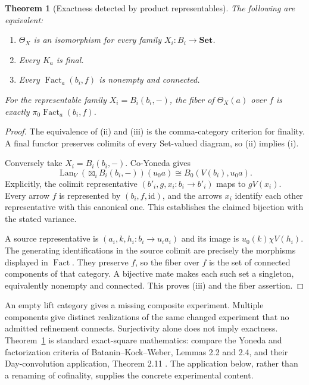 \documentclass[11pt]{article}
\newtheorem{theorem}{Theorem}
\theoremstyle{definition}\newtheorem{definition}[theorem]{Definition}
\theoremstyle{remark}\newtheorem{remark}[theorem]{Remark}
\newcommand{\Set}{\mathbf{Set}}
\newcommand{\Lan}{\operatorname{Lan}}
\newcommand{\Fact}{\operatorname{Fact}}
\newcommand{\id}{\mathrm{id}}
\begin{document}
\begin{theorem}[Exactness detected by product representables]\label{thm:set}
The following are equivalent:
\begin{enumerate}[label=(\roman*)]
\item $\Theta_X$ is an isomorphism for every family $X_i:B_i\to\Set$.
\item Every $K_a$ is final.
\item Every $\Fact_a(b_i,f)$ is nonempty and connected.
\end{enumerate}
For the representable family $X_i=B_i(b_i,-)$, the fiber of
$\Theta_X(a)$ over $f$ is exactly $\pi_0\Fact_a(b_i,f)$.
\end{theorem}
\begin{proof}
The equivalence of (ii) and (iii) is the comma-category criterion for
finality. A final functor preserves colimits of every Set-valued diagram,
so (ii) implies (i).

Conversely take $X_i=B_i(b_i,-)$. Co-Yoneda gives
\[
 \Lan_V(\mathop{\boxtimes}_i B_i(b_i,-))(u_0a)
       \cong B_0(V(b_i),u_0a).
\]
Explicitly, the colimit representative
$(b'_i,g,x_i:b_i\to b'_i)$ maps to $gV(x_i)$. Every arrow $f$ is
represented by $(b_i,f,\id)$, and the arrows $x_i$ identify each other
representative with this canonical one. This establishes the claimed
bijection with the stated variance.

A source representative is $(a_i,k,h_i:b_i\to u_i a_i)$ and its image
is $u_0(k)\chi V(h_i)$. The generating identifications in the source
colimit are precisely the morphisms displayed in $\Fact$. They preserve
$f$, so the fiber over $f$ is the set of connected components of that
category. A bijective mate makes each such set a singleton, equivalently
nonempty and connected. This proves (iii) and the fiber assertion.
\end{proof}

An empty lift category gives a missing composite experiment. Multiple
components give distinct realizations of the same changed experiment
that no admitted refinement connects. Surjectivity alone does not imply
exactness. Theorem~\ref{thm:set} is standard exact-square mathematics:
compare the Yoneda and factorization criteria of
Batanin--Kock--Weber, Lemmas 2.2 and 2.4, and their Day-convolution
application, Theorem 2.11 \cite{BKW}. The application below, rather than
a renaming of cofinality, supplies the concrete experimental content.
\end{document}
